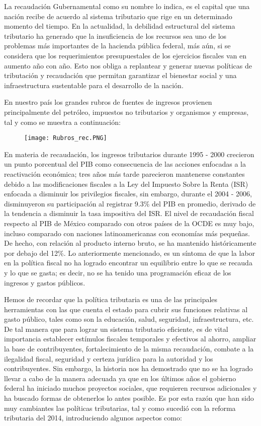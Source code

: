 La recaudación Gubernamental como su nombre lo indica, es el capital que una nación recibe de acuerdo al sistema tributario que rige en un determinado momento del tiempo. En la actualidad, la debilidad estructural del sistema tributario ha generado que la insuficiencia de los recursos sea uno de los problemas más importantes de la hacienda pública federal, más aún, si se considera que los requerimientos presupuestales de los ejercicios fiscales van en aumento año con año. Esto nos obliga a replantear y generar nuevas políticas de tributación y recaudación que permitan garantizar el bienestar social y una infraestructura sustentable para el desarrollo de la nación.\bigskip

En nuestro país los grandes rubros de fuentes de ingresos provienen principalmente del petróleo, impuestos no tributarios y organismos y empresas, tal y como se muestra a continuación:

\begin{figure}[ht]
\texttt{[image: Rubros\_rec.PNG]}
\end{figure}

En materia de recaudación, los ingresos tributarios durante 1995 - 2000 crecieron un punto porcentual del PIB como consecuencia de las acciones enfocadas a la reactivación económica; tres años más tarde parecieron mantenerse constantes debido a las modificaciones fiscales a la Ley del Impuesto Sobre la Renta (ISR) enfocada a disminuir los privilegios fiscales, sin embargo, durante el 2004 - 2006, disminuyeron su participación al registrar 9.3\% del PIB en promedio, derivado de la tendencia a disminuir la tasa impositiva del ISR. El nivel de recaudación fiscal respecto al PIB de México comparado con otros países de la OCDE es muy bajo, incluso comparado con naciones latinoamericanas con economías más pequeñas. De hecho, con relación al producto interno bruto, se ha mantenido históricamente por debajo del 12\%. Lo anteriormente mencionado, es un síntoma de que la labor en la política fiscal no ha logrado encontrar un equilibrio entre lo que se recauda y lo que se gasta; es decir, no se ha tenido una programación eficaz de los ingresos y gastos públicos.\bigskip 


Hemos de recordar que la política tributaria es una de las principales herramientas con las que cuenta el estado para cubrir sus funciones relativas al gasto público, tales como son la educación, salud, seguridad, infraestructura, etc. De tal manera que para lograr un sistema tributario eficiente, es de vital importancia establecer estímulos fiscales temporales y efectivos al ahorro, ampliar la base de contribuyentes, fortalecimiento de la misma recaudación, combate a la ilegalidad fiscal, seguridad y certeza jurídica para la autoridad y los contribuyentes. Sin embargo, la historia nos ha demostrado que no se ha logrado llevar a cabo de la manera adecuada ya que en los últimos años el gobierno federal ha iniciado muchos proyectos sociales, que requieren recursos adicionales y ha buscado formas de obtenerlos lo antes posible. Es por esta razón que han sido muy cambiantes las políticas tributarias, tal y como sucedió con la reforma tributaria del 2014, introduciendo algunos aspectos como:

